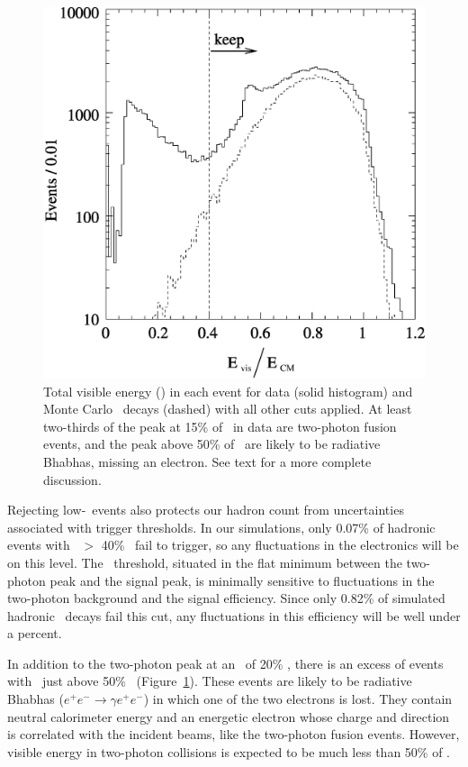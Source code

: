 \documentclass{cornell}
\begin{document}
\begin{figure}[p]
  \begin{center}
    \includegraphics[width=\linewidth]{visen}
  \end{center}
  \caption[Visible energy distribution]{\label{visen} Total visible energy (\visen) in each event
  for data (solid histogram) and Monte Carlo \ups\ decays (dashed)
  with all other cuts applied.  At least two-thirds of the peak at
  15\% of \ecm\ in data are two-photon fusion events, and the peak
  above 50\% of \ecm\ are likely to be radiative Bhabhas, missing an
  electron.  See text for a more complete discussion.}
\end{figure}

Rejecting low-\visen\ events also protects our hadron count from
uncertainties associated with trigger thresholds.  In our simulations,
only 0.07\% of hadronic events with \visen\ $>$ 40\% \ecm\ fail to
trigger, so any fluctuations in the electronics will be on this level.
The \visen\ threshold, situated in the flat minimum between the
two-photon peak and the signal peak, is minimally sensitive to
fluctuations in the two-photon background and the signal efficiency.
Since only 0.82\% of simulated hadronic \ups\ decays fail this cut,
any fluctuations in this efficiency will be well under a percent.

In addition to the two-photon peak at an \visen\ of 20\% \ecm, there
is an excess of events with \visen\ just above 50\% \ecm\
(Figure~\ref{visen}).  These events are likely to be radiative Bhabhas
($e^+e^- \to \gamma e^+e^-$) in which one of the two electrons is
lost.  They contain neutral calorimeter energy and an energetic
electron whose charge and direction is correlated with the incident
beams, like the two-photon fusion events.  However, visible energy in
two-photon collisions is expected to be much less than 50\% of \ecm.
\end{document}
